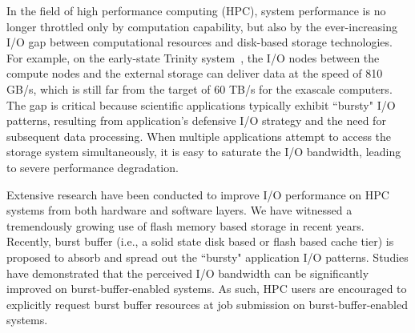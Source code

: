 In the field of high performance computing (HPC), 
system performance is no longer throttled only by computation capability,
but also by the ever-increasing I/O gap
between computational resources and disk-based storage technologies.
For example, on the early-state Trinity system~\cite{TrinitySystem}, the I/O nodes between
the compute nodes and the external storage can deliver data at  the speed of 810 GB/s,
which is still far from the target of 60 TB/s for the exascale computers\cite{Shalf:HPCCS:2010}.
The gap is critical because scientific applications typically exhibit
``bursty" I/O patterns,
resulting from application's defensive I/O strategy
and the need  for subsequent data processing\cite{Carns:MSST:2011, Kim:PDSW:2010, Latham:CSD:2012, Naik:ICPPW:2009, Dennis:CUG:2009}. 
When multiple applications attempt to access the storage system simultaneously, 
it is easy to saturate
the I/O bandwidth, leading to severe performance degradation.


Extensive research have been conducted to improve I/O performance on HPC systems from
both hardware and software layers.
We have witnessed a tremendously growing use of flash memory based storage in recent years.
Recently, burst buffer (i.e., a solid state disk based or flash based cache tier)
is proposed to absorb and spread out
the ``bursty" application I/O patterns\cite{Bent:HBP:2011, Grider:EXA:2010}.
Studies have demonstrated that the perceived I/O
bandwidth can be significantly improved on burst-buffer-enabled systems\cite{Liu:MSST:2012}.
As such, HPC users are encouraged to explicitly request burst buffer resources at job submission 
on burst-buffer-enabled systems\cite{apex-workflow}.

